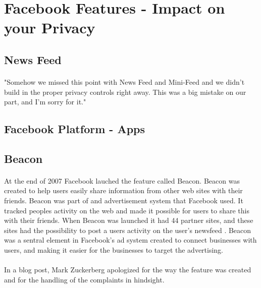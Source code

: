 \section{Facebook Features - Impact on your Privacy}\label{sec:facebook_features}


\subsection{News Feed}
\paragraph{}
"Somehow we missed this point with News Feed and Mini-Feed and we didn't build in the proper privacy controls right away. This was a big mistake on our part, and I'm sorry for it." \cite{FacebookStoryInceptionToIsp}

\subsection{Facebook Platform - Apps}


\subsection{Beacon}

\paragraph{}
At the end of 2007 Facebook lauched the feature called Beacon. Beacon was created to help users easily share information from other web sites with their friends. Beacon was part of and advertisement system that Facebook used. It tracked peoples activity on the web and made it possible for users to share this with their friends. When Beacon was launched it had 44 partner sites, and these sites had the possibility to post a users activity on the user's newsfeed \cite{BeaconWebsites}. Beacon was a sentral element in Facebook's ad system created to connect businesses with users, and making it easier for the businesses to target the advertising. 

\paragraph{}
In a blog post, Mark Zuckerberg apologized for the way the feature was created and for the handling of the complaints in hindsight. 
\cite{Beacon} 

